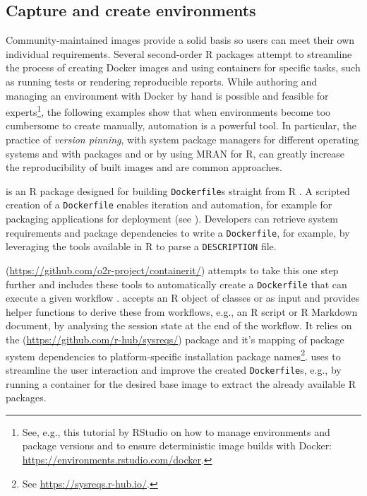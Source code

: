 \hypertarget{capture-and-create-environments}{%
\subsection{Capture and create
environments}\label{capture-and-create-environments}}

\label{envs}

Community-maintained images provide a solid basis so users can meet
their own individual requirements. Several second-order R packages
attempt to streamline the process of creating Docker images and using
containers for specific tasks, such as running tests or rendering
reproducible reports. While authoring and managing an environment with
Docker by hand is possible and feasible for
experts\footnote{See, e.g., this tutorial by RStudio on how to manage environments and package versions and to ensure deterministic image builds with Docker: \href{https://environments.rstudio.com/docker}{https://environments.rstudio.com/docker}.},
the following examples show that when environments become too cumbersome
to create manually, automation is a powerful tool. In particular, the
practice of \emph{version pinning}, with system package managers for
different operating systems and with packages  and
 or by using MRAN for R, can greatly increase the
reproducibility of built images and are common approaches.

\textbf{} is an R package designed for building
\texttt{Dockerfile}s straight from R \citep{cran_dockerfiler}. A
scripted creation of a \texttt{Dockerfile} enables iteration and
automation, for example for packaging applications for deployment (see
). Developers can retrieve system requirements and
package dependencies to write a \texttt{Dockerfile}, for example, by
leveraging the tools available in R to parse a \texttt{DESCRIPTION}
file.

\textbf{}
(\url{https://github.com/o2r-project/containerit/}) attempts to take
this one step further and includes these tools to automatically create a
\texttt{Dockerfile} that can execute a given workflow
\citep{nust_containerit_2019}.  accepts an R object of
classes  or  as input and
provides helper functions to derive these from workflows, e.g., an R
script or R Markdown document, by analysing the session state at the end
of the workflow. It relies on the 
(\url{https://github.com/r-hub/sysreqs/}) package and it's mapping of
package system dependencies to platform-specific installation package
names\footnote{See \href{https://sysreqs.r-hub.io/}{https://sysreqs.r-hub.io/}.}.
 uses  to streamline the user
interaction and improve the created \texttt{Dockerfile}s, e.g., by
running a container for the desired base image to extract the already
available R packages.

